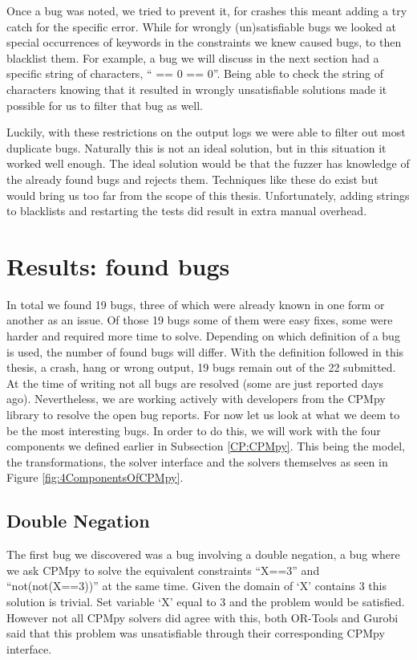 Once a bug was noted, we tried to prevent it, for crashes this meant adding a try catch for the specific error. While for wrongly (un)satisfiable bugs we looked at special occurrences of keywords in the constraints we knew caused bugs, to then blacklist them. For example, a bug we will discuss in the next section had a specific string of characters, “ == 0 == 0”. Being able to check the string of characters knowing that it resulted in wrongly unsatisfiable solutions made it possible for us to filter that bug as well. 

Luckily, with these restrictions on the output logs we were able to filter out most duplicate bugs. Naturally this is not an ideal solution, but in this situation it worked well enough. The ideal solution would be that the fuzzer has knowledge of the already found bugs and rejects them. Techniques like these do exist but would bring us too far from the scope of this thesis. Unfortunately, adding strings to blacklists and restarting the tests did result in extra manual overhead.

\section{Results: found bugs}
\label{res:bugs}
In total we found 19 bugs, three of which were already known in one form or another as an issue. Of those 19 bugs some of them were easy fixes, some were harder and required more time to solve. Depending on which definition of a bug is used, the number of found bugs will differ. With the definition followed in this thesis, a crash, hang or wrong output, 19 bugs remain out of the 22 submitted. At the time of writing not all bugs are resolved (some are just reported days ago). Nevertheless, we are working actively with developers from the CPMpy library to resolve the open bug reports. For now let us look at what we deem to be the most interesting bugs. In order to do this, we will work with the four components we defined earlier in Subsection \ref{CP:CPMpy}. This being the model, the transformations, the solver interface and the solvers themselves as seen in Figure \ref{fig:4ComponentsOfCPMpy}.


\subsection{Double Negation}
\label{res:bug:DoubleNot}
The first bug we discovered was a bug involving a double negation, a bug where we ask CPMpy to solve the equivalent constraints “X==3” and “not(not(X==3))” at the same time. Given the domain of ‘X’ contains 3 this solution is trivial. Set variable ‘X’ equal to 3 and the problem would be satisfied. However not all CPMpy solvers did agree with this, both OR-Tools and Gurobi said that this problem was unsatisfiable through their corresponding CPMpy interface.

